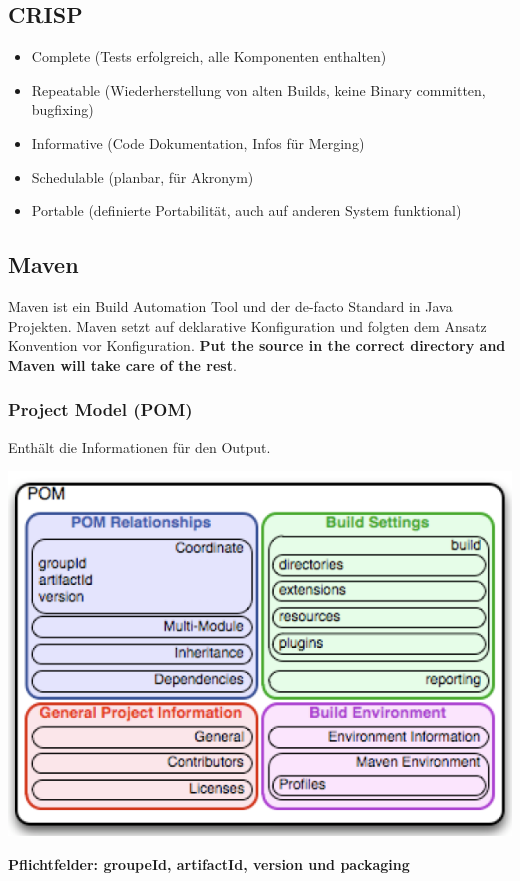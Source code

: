\documentclass[10pt]{article}
\begin{document}
    \subsection{CRISP}
    \begin{itemize}
        \item Complete (Tests erfolgreich, alle Komponenten enthalten)
        \item Repeatable (Wiederherstellung von alten Builds, keine Binary committen, bugfixing)
        \item Informative (Code Dokumentation, Infos f\"ur Merging)
        \item Schedulable (planbar, f\"ur Akronym)
        \item Portable (definierte Portabilit\"at, auch auf anderen System funktional)
    \end{itemize}

    \subsection{Maven}
    Maven ist ein Build Automation Tool und der de-facto Standard in Java Projekten. Maven setzt auf deklarative Konfiguration und folgten dem Ansatz Konvention vor Konfiguration. \textbf{Put the source in the correct directory and Maven will take care of the rest}.

    \subsubsection{Project Model (POM)}
    Enth\"alt die Informationen f\"ur den Output.
    
    \begin{multicols}{2}
    	 
    	\includegraphics[scale=0.5]{assets/pom.png} \\
    \end{multicols}
    \begin{center}
    	   		\textbf{Pflichtfelder: groupeId, artifactId, version und packaging}
    \end{center}
\end{document}
